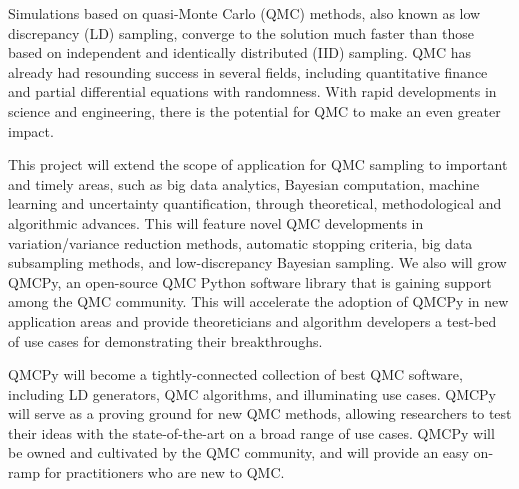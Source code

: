\documentclass[11pt]{article}%
\begin{document}

\noindent Simulations based on quasi-Monte Carlo (QMC) methods, also known as low discrepancy (LD) sampling, converge to the solution much faster than those based on independent and identically distributed (IID) sampling.  QMC has already had resounding success in several fields, including quantitative finance and partial differential equations with randomness. With rapid developments in science and engineering, there is the potential for QMC to make an even greater impact.

This project will extend the scope of application for QMC sampling to important and timely areas, such as big data analytics, Bayesian computation, machine learning and uncertainty quantification, through theoretical, methodological and algorithmic advances. This will feature novel QMC developments in variation/variance reduction methods, automatic stopping criteria, big data subsampling methods, and low-discrepancy Bayesian sampling. We also will grow QMCPy, an open-source QMC Python software library that is gaining support among the QMC community. This will accelerate the adoption of QMCPy in new application areas and provide theoreticians and algorithm developers a test-bed of use cases for demonstrating their breakthroughs.

QMCPy will become a tightly-connected collection of best QMC software, including LD generators, QMC algorithms, and illuminating use cases. QMCPy will serve as a proving ground for new QMC methods, allowing researchers to test their ideas with the state-of-the-art on a broad range of use cases. QMCPy will be owned and cultivated by the QMC community, and will provide an easy on-ramp for practitioners who are new to QMC.


\bigskip

\end{document}
